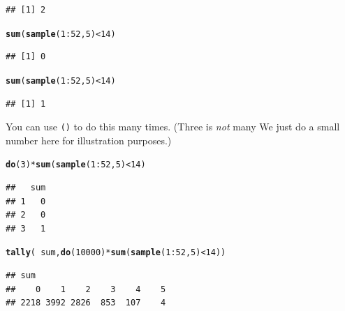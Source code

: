 \documentclass[twoside]{book}\usepackage[]{graphicx}\usepackage[]{xcolor}
\makeatletter
\newcommand{\hlnum}[1]{\textcolor[rgb]{0.686,0.059,0.569}{#1}}%
\newcommand{\hlopt}[1]{\textcolor[rgb]{0,0,0}{#1}}%
\newcommand{\hlstd}[1]{\textcolor[rgb]{0.345,0.345,0.345}{#1}}%
\newcommand{\hlkwd}[1]{\textcolor[rgb]{0.737,0.353,0.396}{\textbf{#1}}}%
\newenvironment{kframe}{%
 \def\at@end@of@kframe{}%
 \ifinner\ifhmode%
  \def\at@end@of@kframe{\end{minipage}}%
  \begin{minipage}{\columnwidth}%
 \fi\fi%
 \def\FrameCommand##1{\hskip\@totalleftmargin \hskip-\fboxsep
 \colorbox{shadecolor}{##1}\hskip-\fboxsep
     \hskip-\linewidth \hskip-\@totalleftmargin \hskip\columnwidth}%
 \MakeFramed {\advance\hsize-\width
   \@totalleftmargin\z@ \linewidth\hsize
   \@setminipage}}%
 {\par\unskip\endMakeFramed%
 \at@end@of@kframe}
\newenvironment{knitrout}{}{} %
\newcommand{\Rindex}[1]{\index{\texttt{#1}}}
\newcommand{\function}[1]{{\color{purple!75!blue}\texttt{\StrSubstitute{#1}{()}{}()}}\Rindex{#1}}
\makeatother
\begin{document}
\begin{problem}
\begin{knitrout}
\begin{kframe}
\begin{alltt}
\end{alltt}
\begin{verbatim}
## [1] 2
\end{verbatim}
\begin{alltt}
\hlkwd{sum}\hlstd{(} \hlkwd{sample}\hlstd{(}\hlnum{1}\hlopt{:}\hlnum{52}\hlstd{,} \hlnum{5}\hlstd{)} \hlopt{<} \hlnum{14} \hlstd{)}
\end{alltt}
\begin{verbatim}
## [1] 0
\end{verbatim}
\begin{alltt}
\hlkwd{sum}\hlstd{(} \hlkwd{sample}\hlstd{(}\hlnum{1}\hlopt{:}\hlnum{52}\hlstd{,} \hlnum{5}\hlstd{)} \hlopt{<} \hlnum{14} \hlstd{)}
\end{alltt}
\begin{verbatim}
## [1] 1
\end{verbatim}
\end{kframe}
\end{knitrout}
	You can use \function{do()} to do this many times. (Three is \emph{not} many\! We just do a small number here 
	for illustration purposes.)
\begin{knitrout}
\color{fgcolor}\begin{kframe}
\begin{alltt}
\hlkwd{do}\hlstd{(}\hlnum{3}\hlstd{)} \hlopt{*} \hlkwd{sum}\hlstd{(} \hlkwd{sample}\hlstd{(} \hlnum{1}\hlopt{:}\hlnum{52}\hlstd{,} \hlnum{5} \hlstd{)} \hlopt{<} \hlnum{14} \hlstd{)}
\end{alltt}
\begin{verbatim}
##   sum
## 1   0
## 2   0
## 3   1
\end{verbatim}
\end{kframe}
\end{knitrout}
\end{problem}

\begin{solution}
\begin{knitrout}
\color{fgcolor}\begin{kframe}
\begin{alltt}
\hlkwd{tally}\hlstd{(} \hlopt{~} \hlstd{sum,} \hlkwd{do}\hlstd{(}\hlnum{10000}\hlstd{)} \hlopt{*} \hlkwd{sum}\hlstd{(}\hlkwd{sample}\hlstd{(}\hlnum{1}\hlopt{:}\hlnum{52}\hlstd{,} \hlnum{5}\hlstd{)} \hlopt{<} \hlnum{14}\hlstd{) )}
\end{alltt}
\begin{verbatim}
## sum
##    0    1    2    3    4    5 
## 2218 3992 2826  853  107    4
\end{verbatim}
\end{kframe}
\end{knitrout}
\end{solution}
\end{document}
